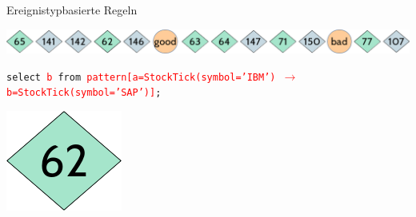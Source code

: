 \documentclass[usenames,dvipsnames]{beamer}
\begin{document}
\begin{frame}{Ereignistypbasierte Regeln}
\begin{center}
    \includegraphics[scale=0.4]{img/stream-2}
\end{center}
\hspace{3cm}
\begin{exampleblock}{}
    \begin{center}
    \texttt{select \textcolor{red}{b} from 
    \textcolor{red}{pattern[a=StockTick(symbol='IBM') $\rightarrow$ 
    b=StockTick(symbol='SAP')]};}
\end{center}
\end{exampleblock}
\hspace{3cm}
\begin{center}
    \includegraphics[scale=0.25]{img/solution-a}
\end{center}

\end{frame}
\end{document}
